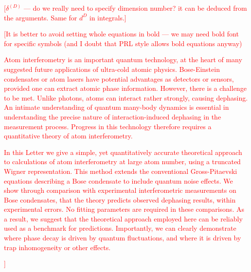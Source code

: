 \documentclass[aps,prl,twocolumn,showpacs,amsmath,amssymb,superscriptaddress]{revtex4-1}
\newcommand{\remark}[1]{\textcolor{red}{{[}#1{]}}}
\begin{document}
	\remark{$\delta^{(D)}$ --- do we really need to specify dimension number? it can be deduced from the arguments. Same for $d^D$ in integrals.}
	\remark{It is better to avoid setting whole equations in bold --- we may need bold font for specific symbols (and I doubt that PRL style allows bold equations anyway)

Atom interferometry is an important quantum technology,
at the heart of many suggested future applications of ultra-cold atomic physics.
Bose-Einstein condensates or atom lasers have potential advantages as detectors or sensors,
provided one can extract atomic phase information.
However, there is a challenge to be met.
Unlike photons, atoms can interact rather strongly, causing dephasing.
An intimate understanding of quantum many-body dynamics is essential in understanding
the precise nature of interaction-induced dephasing in the measurement process.
Progress in this technology therefore requires a quantitative theory of atom interferometry.

In this Letter we give a simple, yet quantitatively accurate
theoretical approach to calculations of atom interferometry at large atom number,
using a truncated Wigner representation.
This method extends the conventional Gross-Pitaevski equations
describing a Bose condensate to include quantum noise effects.
We show through comparison with experimental interferometric measurements on Bose condensates,
that the theory predicts observed dephasing results, within experimental errors.
No fitting parameters are required in these comparisons.
As a result, we suggest that the theoretical approach employed here
can be reliably used as a benchmark for predictions.
Importantly, we can clearly demonstrate where phase decay is driven by quantum fluctuations,
and where it is driven by trap inhomogeneity or other effects.

}
\end{document}
